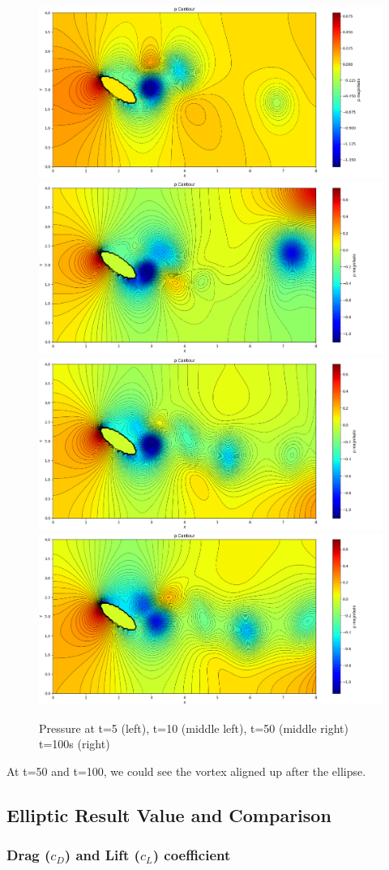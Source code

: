 \documentclass[12pt]{article}
\begin{document}

\begin{figure}[H]
    \centering
    \includegraphics[width=0.23\linewidth]{figure/Ellip_N32_Re300_8x4_t05/p_Ellip_N32_Re300_8x4_t05.jpg}
    \includegraphics[width=0.23\linewidth]{figure/Ellip_N32_Re300_8x4_t10/p_Ellip_N32_Re300_8x4_t10.jpg}
    \includegraphics[width=0.23\linewidth]{figure/Ellip_N32_Re300_8x4_t50/p_Ellip_N32_Re300_8x4_t50.jpg}
    \includegraphics[width=0.23\linewidth]{figure/Ellip_N32_Re300_8x4_t100/p_Ellip_N32_Re300_8x4_t100.jpg}
    \caption{Pressure at t=5 (left), t=10 (middle left), t=50 (middle right) t=100s (right)}
\end{figure}

At t=50 and t=100, we could see the vortex aligned up after the ellipse.








\subsection{Elliptic Result Value and Comparison}

\subsubsection{Drag ($c_D$) and Lift ($c_L$) coefficient}
\end{document}

